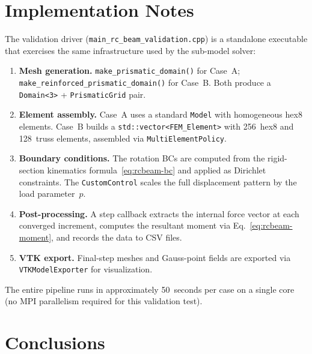 \section{Implementation Notes}
\label{sec:rcbeam-implementation}

The validation driver (\texttt{main\_rc\_beam\_validation.cpp}) is a
standalone executable that exercises the same infrastructure used by the
sub-model solver:

\begin{enumerate}
  \item \textbf{Mesh generation.}
        \texttt{make\_prismatic\_domain()} for Case~A;
        \texttt{make\_reinforced\_prismatic\_domain()} for Case~B.
        Both produce a \texttt{Domain<3>} + \texttt{PrismaticGrid} pair.

  \item \textbf{Element assembly.}
        Case~A uses a standard \texttt{Model} with homogeneous hex8
        elements.  Case~B builds a \texttt{std::vector<FEM\_Element>}
        with 256~hex8 and 128~truss elements, assembled via
        \texttt{MultiElementPolicy}.

  \item \textbf{Boundary conditions.}
        The rotation BCs are computed from the rigid-section kinematics
        formula~\eqref{eq:rcbeam-bc} and applied as Dirichlet constraints.
        The \texttt{CustomControl} scales the full displacement pattern
        by the load parameter~$p$.

  \item \textbf{Post-processing.}
        A step callback extracts the internal force vector at each
        converged increment, computes the resultant moment via
        Eq.~\eqref{eq:rcbeam-moment}, and records the data to CSV
        files.

  \item \textbf{VTK export.}
        Final-step meshes and Gauss-point fields are exported via
        \texttt{VTKModelExporter} for visualization.
\end{enumerate}

The entire pipeline runs in approximately 50~seconds per case on a
single core (no MPI parallelism required for this validation test).


\section{Conclusions}
\label{sec:rcbeam-conclusions}

